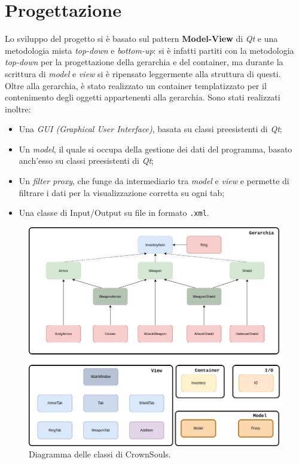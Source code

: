 \section{Progettazione}
Lo sviluppo del progetto si è basato sul pattern \textbf{Model-View} di \textit{Qt} e una metodologia mista \textit{top-down} e \textit{bottom-up}: si è infatti partiti con la metodologia \textit{top-down} per la progettazione della gerarchia e del container, ma durante la scrittura di \textit{model} e \textit{view} si è ripensato leggermente alla struttura di questi. \\
Oltre alla gerarchia, è stato realizzato un container templatizzato per il contenimento degli oggetti appartenenti alla gerarchia.
Sono stati realizzati inoltre:
\begin{itemize}
  \item Una \textit{GUI (Graphical User Interface)}, basata su classi preesistenti di \textit{Qt};
  \item Un \textit{model}, il quale si occupa della gestione dei dati del programma, basato anch'esso su classi preesistenti di \textit{Qt};
  \item Un \textit{filter proxy}, che funge da intermediario tra \textit{model} e \textit{view} e permette di filtrare i dati per la visualizzazione corretta su ogni tab;
  \item Una classe di Input/Output su file in formato \texttt{.xml}.
\end{itemize}

\begin{figure}[H]
  \centering
  \includegraphics[width = \linewidth]{img/diagramma}
  \caption{Diagramma delle classi di CrownSouls.}
\end{figure}

